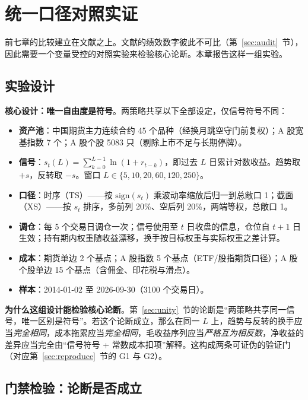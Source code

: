 \section{统一口径对照实证}\label{sec:empirical}

前七章的比较建立在文献之上。文献的绩效数字彼此不可比（第~\ref{sec:audit}~节），因此需要一个变量受控的对照实验来检验核心论断。本章报告这样一组实验。

\subsection{实验设计}

\textbf{核心设计：唯一自由度是符号}。两策略共享以下全部设定，仅信号符号不同：

\begin{itemize}[leftmargin=2.2em]
  \item \textbf{资产池}：中国期货主力连续合约 45 个品种（经换月跳空守门前复权）；A 股宽基指数 7 个；A 股个股 5083 只（剔除上市不足与长期停牌）。
  \item \textbf{信号}：$s_t(L)=\sum_{k=0}^{L-1}\ln(1+r_{t-k})$，即过去 $L$ 日累计对数收益。趋势取 $+s$，反转取 $-s$。窗口 $L\in\{5,10,20,60,120,250\}$。
  \item \textbf{口径}：时序（TS）——按 $\mathrm{sign}(s_t)$ 乘波动率缩放后归一到总敞口 1；截面（XS）——按 $s_t$ 排序，多前列 20\%、空后列 20\%，两端等权，总敞口 1。
  \item \textbf{调仓}：每 5 个交易日调仓一次；信号使用至 $t$ 日收盘的信息，仓位自 $t+1$ 日生效；持有期内权重随收益漂移，换手按目标权重与实际权重之差计算。
  \item \textbf{成本}：期货单边 2 个基点；A 股指数 5 个基点（ETF/股指期货口径）；A 股个股单边 15 个基点（含佣金、印花税与滑点）。
  \item \textbf{样本}：2014-01-02 至 2026-09-30（3100 个交易日）。
\end{itemize}

\textbf{为什么这组设计能检验核心论断}。第~\ref{sec:unity}~节的论断是“两策略共享同一信号，唯一区别是符号”。若这个论断成立，那么在同一 $L$ 上，趋势与反转的换手应当\emph{完全相同}，成本拖累应当\emph{完全相同}，毛收益序列应当\emph{严格互为相反数}，净收益的差异应当完全由“信号符号 + 常数成本扣项”解释。这构成两条可证伪的验证门（对应第~\ref{sec:reproduce}~节的 G1 与 G2）。

\subsection{门禁检验：论断是否成立}

